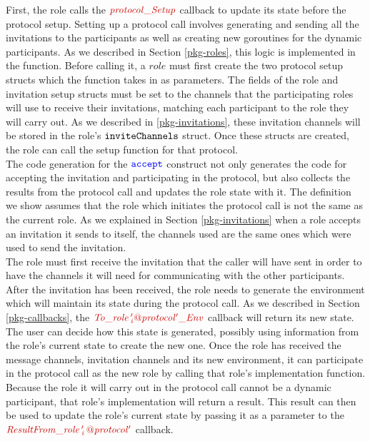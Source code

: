 \documentclass[12pt,twoside]{report}
\begin{document}
First, the role calls the $\functionname{protocol\_Setup}$ callback to update its state before the protocol setup. Setting up a protocol call involves generating and sending all the invitations to the participants as well as creating new goroutines for the dynamic participants. As we described in Section \ref{pkg-roles}, this logic is implemented in the {\color{dkred}\textit{}} function. Before calling it, a $\mathit{role}$ must first create the two protocol setup structs which the function takes in as parameters. The fields of the role and invitation setup structs must be set to the channels that the participating roles will use to receive their invitations, matching each participant to the role they will carry out. As we described in \ref{pkg-invitations}, these invitation channels will be stored in the role's ${\mathtt{inviteChannels}}$ struct. Once these structs are created, the role can call the setup function for that protocol.\\

The code generation for the ${\color{blue}\mathtt{accept}}$ construct not only generates the code for accepting the invitation and participating in the protocol, but also collects the results from the protocol call and updates the role state with it. The definition we show assumes that the role which initiates the protocol call is not the same as the current role. As we explained in Section \ref{pkg-invitations} when a role accepts an invitation it sends to itself, the channels used are the same ones which were used to send the invitation.\\

The role must first receive the invitation that the caller will have sent in order to have the channels it will need for communicating with the other participants. After the invitation has been received, the role needs to generate the environment which will maintain its state during the protocol call. As we described in Section \ref{pkg-callbacks}, the $\functionname{To\_role\,'_i@protocol'\_Env}$ callback will return its new state. The user can decide how this state is generated, possibly using information from the role's current state to create the new one. Once the role has received the message channels, invitation channels and its new environment, it can participate in the protocol call as the new role by calling that role's implementation function. Because the role it will carry out in the protocol call cannot be a dynamic participant, that role's implementation will return a result. This result can then be used to update the role's current state by passing it as a parameter to the $\functionname{ResultFrom\_role\,'_i\,@protocol'}$ callback.
\end{document}
